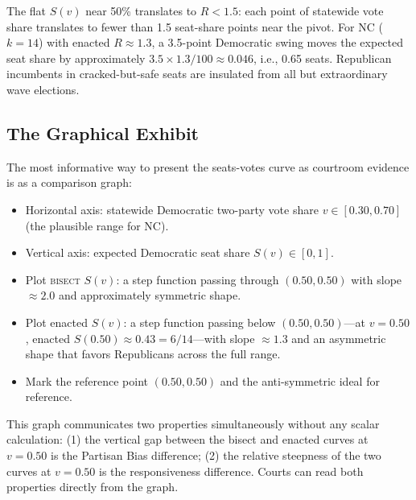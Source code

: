 The flat $S(v)$ near 50\% translates to $R < 1.5$: each point of statewide
vote share translates to fewer than 1.5 seat-share points near the pivot.
For NC ($k=14$) with enacted $R \approx 1.3$, a 3.5-point Democratic swing
moves the expected seat share by approximately $3.5 \times 1.3 / 100 \approx
0.046$, i.e., 0.65 seats. Republican incumbents in cracked-but-safe seats
are insulated from all but extraordinary wave elections.

\subsection{The Graphical Exhibit}

The most informative way to present the seats-votes curve as courtroom evidence
is as a comparison graph:
\begin{itemize}
\item Horizontal axis: statewide Democratic two-party vote share $v \in [0.30, 0.70]$
  (the plausible range for NC).
\item Vertical axis: expected Democratic seat share $S(v) \in [0, 1]$.
\item Plot \textsc{bisect} $S(v)$: a step function passing through $(0.50, 0.50)$
  with slope $\approx 2.0$ and approximately symmetric shape.
\item Plot enacted $S(v)$: a step function passing below $(0.50, 0.50)$---at
  $v = 0.50$, enacted $S(0.50) \approx 0.43 = 6/14$---with slope $\approx 1.3$
  and an asymmetric shape that favors Republicans across the full range.
\item Mark the reference point $(0.50, 0.50)$ and the anti-symmetric ideal
  for reference.
\end{itemize}
This graph communicates two properties simultaneously without any scalar calculation:
(1) the vertical gap between the bisect and enacted curves at $v=0.50$ is the
Partisan Bias difference; (2) the relative steepness of the two curves at $v=0.50$
is the responsiveness difference. Courts can read both properties directly from
the graph.
